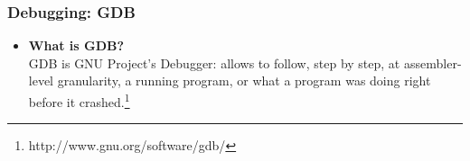 \documentclass[]{beamer}
\begin{document}
\begin{frame}
  \frametitle{Debugging: GDB}
  \begin{itemize}
  \item{{\bf What is GDB?}}\\
    GDB is GNU Project's Debugger: allows to follow, step by step, at assembler-level granularity, a running program, or what a program was doing right before it crashed.\footnote{http://www.gnu.org/software/gdb/}
  \end{itemize}
\end{frame}


\end{document}

